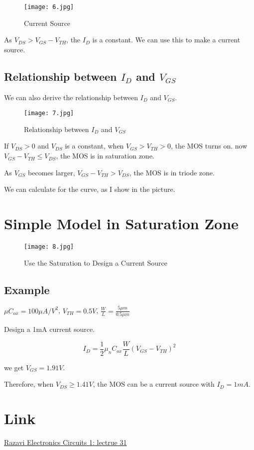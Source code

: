 \documentclass[fontset=windows]{article}
\begin{document}
\begin{figure}[htbp]
    \centering
    \texttt{[image: 6.jpg]}
    \captionsetup{labelformat=empty}
    \caption{Current Source}
    \label{6}
\end{figure}

As $V_{DS}>V_{GS}-V_{TH}$, the $I_D$ is a constant. We can use this to make a current source. 

\subsection*{Relationship between $I_D$ and $V_{GS}$}

We can also derive the relationship between $I_D$ and $V_{GS}$. 

\begin{figure}[htbp]
    \centering
    \texttt{[image: 7.jpg]}
    \captionsetup{labelformat=empty}
    \caption{Relationship between $I_D$ and $V_{GS}$}
    \label{7}
\end{figure}

If $V_{DS}>0$ and $V_{DS}$ is a constant, when $V_{GS}>V_{TH}>0$, the MOS turns on. 
now $V_{GS}-V_{TH} \leq V_{DS}$, the MOS is in saturation zone. 

As $V_{GS}$ becomes larger, $V_{GS}-V_{TH}>V_{DS}$, the MOS is in triode zone. 

We can calculate for the curve, as I show in the picture. 

\section*{Simple Model in Saturation Zone}

\begin{figure}[htbp]
    \centering
    \texttt{[image: 8.jpg]}
    \captionsetup{labelformat=empty}
    \caption{Use the Saturation to Design a Current Source}
    \label{8}
\end{figure}

\subsection*{Example}

$\mu C_{ox}=100\mu A/V^2$, $V_{TH}=0.5V$, $\frac{W}{L}=\frac{5\mu m}{0.5\mu m}$

Design a 1mA current source. 

$$I_D=\frac{1}{2}\mu_nC_{ox}\frac{W}{L}(V_{GS}-V_{TH})^2$$

we get $V_{GS}=1.91V$. 

Therefore, when $V_{DS}\geq 1.41V$, the MOS can be a current source with $I_D=1mA$. 

\section*{Link}

\href{https://www.bilibili.com/video/BV1FD4y1R7Ah?p=31&vd_source=1d0c07486a3bd3b0adb8ac548bf6453e}{Razavi Electronics Circuits 1: lectrue 31}
\end{document}
